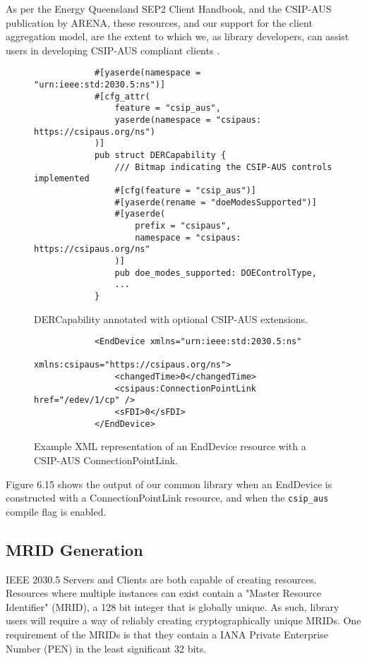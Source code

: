 As per the Energy Queensland SEP2 Client Handbook, and the CSIP-AUS publication by ARENA, these resources, and our support for the client aggregation model, are the extent to which we, as library developers, can assist users in developing CSIP-AUS compliant clients \cite{sep2clienthandbook} \cite{CSIPAus}. 

\begin{figure}[H]
    \begin{center}
        \begin{lstlisting}
            #[yaserde(namespace = "urn:ieee:std:2030.5:ns")]
            #[cfg_attr(
                feature = "csip_aus",
                yaserde(namespace = "csipaus: https://csipaus.org/ns")
            )]
            pub struct DERCapability {
                /// Bitmap indicating the CSIP-AUS controls implemented
                #[cfg(feature = "csip_aus")]
                #[yaserde(rename = "doeModesSupported")]
                #[yaserde(
                    prefix = "csipaus", 
                    namespace = "csipaus: https://csipaus.org/ns"
                )]
                pub doe_modes_supported: DOEControlType,
                ...
            }
        \end{lstlisting}
        \label{fig:csipausimpl}
        \caption{DERCapability annotated with optional CSIP-AUS extensions.}
    \end{center}
\end{figure}

\begin{figure}[H]
    \begin{center}
        \begin{lstlisting}
            <EndDevice xmlns="urn:ieee:std:2030.5:ns" 
                       xmlns:csipaus="https://csipaus.org/ns">
                <changedTime>0</changedTime>
                <csipaus:ConnectionPointLink  href="/edev/1/cp" />
                <sFDI>0</sFDI>
            </EndDevice>
        \end{lstlisting}
        \label{fig:enddeviceconnpointxml}
        \caption{Example XML representation of an EndDevice resource with a CSIP-AUS ConnectionPointLink.}
    \end{center}
\end{figure}

Figure 6.15 shows the output of our common library when an EndDevice is constructed with a ConnectionPointLink resource, and when the \texttt{csip\_aus} compile flag is enabled.


\subsection{MRID Generation}
IEEE 2030.5 Servers and Clients are both capable of creating resources. Resources where multiple instances can exist contain a "Master Resource Identifier" (MRID), a 128 bit integer that is globally unique.
As such, library users will require a way of reliably creating cryptographically unique MRIDs. One requirement of the MRIDs is that they contain a IANA Private Enterprise Number (PEN) in the least significant 32 bits.

